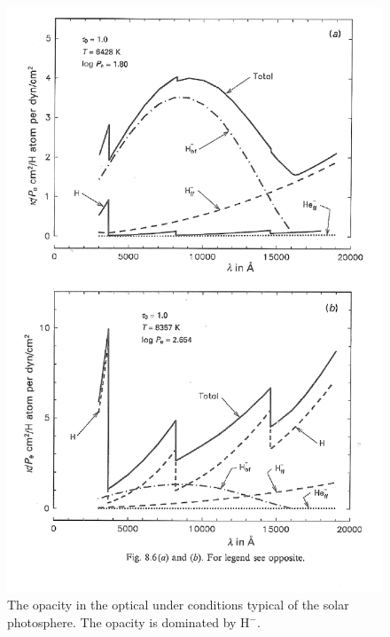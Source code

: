 \begin{figure}
\centering
\includegraphics[width=0.7\linewidth]{figures/opacity-a.pdf}
\caption{The opacity in the optical under conditions typical of the solar photosphere. The opacity is dominated by $\mathrm{H}^-$.}
\end{figure}

